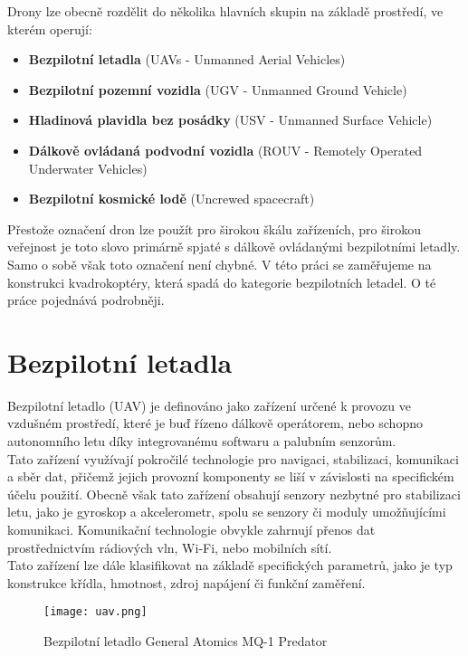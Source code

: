 \documentclass[12pt]{report}
\begin{document}
Drony lze obecně rozdělit do několika hlavních skupin na základě prostředí, ve kterém operují:
\begin{itemize}
	\item \textbf{Bezpilotní letadla} (UAVs - Unmanned Aerial Vehicles)
	\item \textbf{Bezpilotní pozemní vozidla} (UGV - Unmanned Ground Vehicle)
	\item \textbf{Hladinová plavidla bez posádky} (USV - Unmanned Surface Vehicle)
	\item \textbf{Dálkově ovládaná podvodní vozidla} (ROUV - Remotely Operated Underwater Vehicles)
	\item \textbf{Bezpilotní kosmické lodě} (Uncrewed spacecraft)
\end{itemize}

Přestože označení dron lze použít pro širokou škálu zařízeních, pro širokou veřejnost je toto slovo primárně spjaté s dálkově ovládanými bezpilotními letadly. Samo o sobě však toto označení není chybné. V této práci se zaměřujeme na konstrukci kvadrokoptéry, která spadá do kategorie bezpilotních letadel. O té práce pojednává podrobněji. \cite{mainbook}

\section[Bezpilotní letadla]{Bezpilotní letadla}
Bezpilotní letadlo (UAV) je definováno jako zařízení určené k provozu ve vzdušném prostředí, které je buď řízeno dálkově operátorem, nebo schopno autonomního letu díky integrovanému softwaru a palubním senzorům.\\
Tato zařízení využívají pokročilé technologie pro navigaci, stabilizaci, komunikaci a sběr dat, přičemž jejich provozní komponenty se liší v závislosti na specifickém účelu použití. Obecně však tato zařízení obsahují senzory nezbytné pro stabilizaci letu, jako je gyroskop a akcelerometr, spolu se senzory či moduly umožňujícími komunikaci. Komunikační technologie obvykle zahrnují přenos dat prostřednictvím rádiových vln, Wi-Fi, nebo mobilních sítí.\\
Tato zařízení lze dále klasifikovat na základě specifických parametrů, jako je typ konstrukce křídla, hmotnost, zdroj napájení či funkční zaměření.\\

\begin{figure}[H]
	\centering
	\texttt{[image: uav.png]}
	\caption{Bezpilotní letadlo General Atomics MQ-1 Predator \cite{mainbook}}
	\label{fig:uav.png}
  \end{figure}
\end{document}
